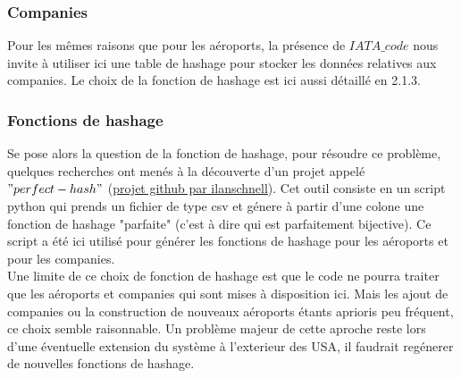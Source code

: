 \documentclass[a4paper, 12pt]{article}
\begin{document}
	\subsubsection{Companies}
	Pour les mêmes raisons que pour les aéroports, la présence de $IATA\_code$ nous invite à utiliser ici une table de hashage pour stocker les données relatives aux companies.
	Le choix de la fonction de hashage est ici aussi détaillé en 2.1.3.\\
	
	\subsubsection{Fonctions de hashage}
	Se pose alors la question de la fonction de hashage, pour résoudre ce problème, quelques recherches ont menés à la découverte d'un projet appelé \\$"perfect-hash"$ (\href{https://github.com/ilanschnell/perfect-hash}{projet github par ilanschnell}). Cet outil consiste en un script python qui prends un fichier de type csv et génere à partir d'une colone une fonction de hashage "parfaite" (c'est à dire qui est parfaitement bijective). Ce script a été ici utilisé pour générer les fonctions de hashage pour les aéroports et pour les companies.\\
	
	Une limite de ce choix de fonction de hashage est que le code ne pourra traiter que les aéroports et companies qui sont mises à disposition ici. Mais les ajout de companies ou la construction de nouveaux aéroports étants aprioris peu fréquent, ce choix semble raisonnable. Un problème majeur de cette aproche reste lors d'une éventuelle extension du système à l'exterieur des USA, il faudrait regénerer de nouvelles fonctions de hashage.
	
\end{document}
